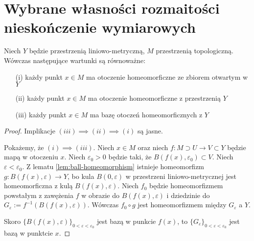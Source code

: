 \section{Wybrane własności rozmaitości nieskończenie wymiarowych}

\begin{lem} \label{lem:basic-atlas}
  Niech $Y$ będzie przestrzenią liniowo-metryczną, $M$ przestrzenią topologiczną. Wówczas następujące wartunki są równoważne:
  \begin{enumerate}
   \item[(i)] każdy punkt $x \in M$ ma otoczenie homeomorficzne ze zbiorem otwartym w $Y$
   \item[(ii)] każdy punkt $x \in M$ ma otoczenie homeomorficzne z przestrzenią $Y$
   \item[(iii)] każdy punkt $x \in M$ ma bazę otoczeń homeomorficznych z $Y$
  \end{enumerate}

  \begin{proof}
    Implikacje $(iii) \implies (ii) \implies (i)$ są jasne.
    
    Pokażemy, że $(i) \implies (iii)$. Niech $x \in M$ oraz niech $f: M \supset U \to V \subset Y$ będzie mapą w otoczeniu $x$. Niech $\varepsilon_0 > 0$ będzie taki, że $B(f(x), \varepsilon_0) \subset V$. Niech $\varepsilon < \varepsilon_0$. Z lematu \ref{lem:ball-homeomorphism} istnieje homeomorfizm $g: B(f(x), \varepsilon) \to Y$, bo kula $B(0, \varepsilon)$ w przestrzeni liniowo-metrycznej jest homeomorficzna z kulą $B(f(x), \varepsilon)$. Niech $f_0$ będzie homeomorfizmem powstałym z zawężenia $f$ w obrazie do $B(f(x), \varepsilon)$ i dziedzinie do $G_\varepsilon := f^{-1}(B(f(x), \varepsilon))$. Wówczas $f_0 \circ g$ jest homeomorfizmem między $G_\varepsilon$ a $Y$.
    
    Skoro $\{B(f(x), \varepsilon)\}_{0 < \varepsilon < \varepsilon_0}$ jest bazą w punkcie $f(x)$, to $\{G_\varepsilon\}_{0 < \varepsilon < \varepsilon_0}$ jest bazą w punktcie $x$.
  \end{proof}
\end{lem}

